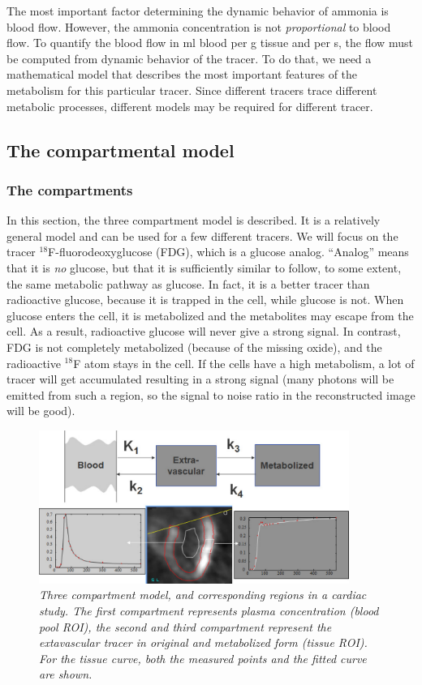 \documentclass[11pt,oneside]{book}
\begin{document}
The most important factor determining the dynamic behavior of ammonia
is blood flow. However, the ammonia concentration is not {\em
proportional} to blood flow. To quantify the blood flow in ml blood
per g tissue and per s, the flow must be computed from dynamic
behavior of the tracer. To do that, we need a mathematical model that
describes the most important features of the metabolism for this
particular tracer. Since different tracers trace different metabolic
processes, different models may be required for different tracer.

\subsection{The compartmental model}
\subsubsection{The compartments}
In this section, the three compartment model is described. It is a
relatively general model and can be used for a few different
tracers. We will focus on the tracer $^{18}$F-fluorodeoxyglucose
(FDG), which is a glucose analog.  ``Analog'' means that it is {\em
no} glucose, but that it is sufficiently similar to follow, to some
extent, the same metabolic pathway as glucose. In fact, it is a better
tracer than radioactive glucose, because it is trapped in the cell,
while glucose is not. When glucose enters the cell, it is metabolized
and the metabolites may escape from the cell. As a result, radioactive
glucose will never give a strong signal. In contrast, FDG is not
completely metabolized (because of the missing oxide), and the
radioactive $^{18}$F atom stays in the cell. If the cells have a high
metabolism, a lot of tracer will get accumulated resulting in a strong
signal (many photons will be emitted from such a region, so the signal
to noise ratio in the reconstructed image will be good).

\begin{figure}[tb]
\centering
\includegraphics[width=0.9\textwidth]{figs/fig_kinemodel.pdf}
\caption{\label{fig:kinemodel} \emph{Three compartment model, and
corresponding regions in a cardiac study. The first compartment represents
plasma concentration (blood pool ROI), the second and third compartment
represent the extavascular tracer in original and metabolized form (tissue
ROI). For the tissue curve, both the measured points and the fitted curve are
shown.}}
\end{figure}
\end{document}

